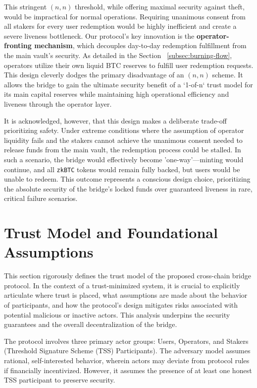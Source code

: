 \documentclass{DESSThesis}
\newcommand{\zktoken}{\texttt{zkBTC}}
\begin{document}
This stringent $(n, n)$ threshold, while offering maximal security against theft, would be impractical for normal operations. Requiring unanimous consent from all stakers for every user redemption would be highly inefficient and create a severe liveness bottleneck. Our protocol's key innovation is the \textbf{operator-fronting mechanism}, which decouples day-to-day redemption fulfillment from the main vault's security. As detailed in the Section ~\ref{subsec:burning-flow}, operators utilize their own liquid BTC reserves to fulfill user redemption requests. This design cleverly dodges the primary disadvantage of an $(n, n)$ scheme. It allows the bridge to gain the ultimate security benefit of a `1-of-n` trust model for its main capital reserves while maintaining high operational efficiency and liveness through the operator layer.

It is acknowledged, however, that this design makes a deliberate trade-off prioritizing safety. Under extreme conditions where the assumption of operator liquidity fails and the stakers cannot achieve the unanimous consent needed to release funds from the main vault, the redemption process could be stalled. In such a scenario, the bridge would effectively become 'one-way'—minting would continue, and all \texttt{\zktoken} tokens would remain fully backed, but users would be unable to redeem. This outcome represents a conscious design choice, prioritizing the absolute security of the bridge's locked funds over guaranteed liveness in rare, critical failure scenarios.

\section{Trust Model and Foundational Assumptions} \label{sec:trust-model-and-assumption}

This section rigorously defines the trust model of the proposed cross-chain bridge protocol. In the context of a trust-minimized system, it is crucial to explicitly articulate where trust is placed, what assumptions are made about the behavior of participants, and how the protocol's design mitigates risks associated with potential malicious or inactive actors. This analysis underpins the security guarantees and the overall decentralization of the bridge.

The protocol involves three primary actor groups: Users, Operators, and Stakers (Threshold Signature Scheme (TSS) Participants). The adversary model assumes rational, self-interested behavior, wherein actors may deviate from protocol rules if financially incentivized. However, it assumes the presence of at least one honest TSS participant to preserve security.
\end{document}
